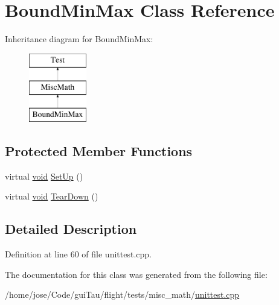 \hypertarget{class_bound_min_max}{\section{Bound\-Min\-Max Class Reference}
\label{class_bound_min_max}
}
Inheritance diagram for Bound\-Min\-Max\-:\begin{figure}[H]
\begin{center}
\leavevmode
\includegraphics[height=3.000000cm]{class_bound_min_max}
\end{center}
\end{figure}
\subsection*{Protected Member Functions}
\begin{DoxyCompactItemize}
\item 
virtual \hyperlink{group___n_a_m_e_ga18028b8badbf1ea7e704ccac3c488e82}{void} \hyperlink{group___unit_tests_gaa083f26ac602b6553ebd522ebce74b44}{Set\-Up} ()
\item 
virtual \hyperlink{group___n_a_m_e_ga18028b8badbf1ea7e704ccac3c488e82}{void} \hyperlink{group___unit_tests_ga5b1a04dbcaaa9db5e928c59c87d81a69}{Tear\-Down} ()
\end{DoxyCompactItemize}


\subsection{Detailed Description}


Definition at line 60 of file unittest.\-cpp.



The documentation for this class was generated from the following file\-:\begin{DoxyCompactItemize}
\item 
/home/jose/\-Code/gui\-Tau/flight/tests/misc\-\_\-math/\hyperlink{misc__math_2unittest_8cpp}{unittest.\-cpp}\end{DoxyCompactItemize}
